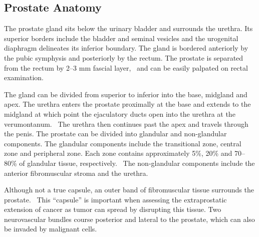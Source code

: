 ﻿\subsection{Prostate Anatomy}

The prostate gland sits below the urinary bladder and surrounds the urethra.
Its superior borders include the bladder and seminal vesicles and the
urogenital diaphragm delineates its inferior boundary. The gland is bordered
anteriorly by the pubic symphysis and posteriorly by the rectum.  The prostate
is separated from the rectum by 2--3 mm fascial layer,~\cite{Jung2012} and can
be easily palpated on rectal examination. 

The gland can be divided from superior to inferior into the base, midgland and
apex. The urethra enters the prostate proximally at the base and extends to the
midgland at which point the ejaculatory ducts open into the urethra at the
verumontanum.~\cite{Jung2012} The urethra then continues past the apex and
travels through the penis. The prostate can be divided into glandular and
non-glandular components.  The glandular components include the transitional
zone, central zone and peripheral zone. Each zone contains approximately 5\%,
20\% and 70--80\% of glandular tissue, respectively.~\cite{Bonekamp2011} The
non-glandular components include the anterior fibromuscular stroma and the
urethra. 

Although not a true capsule, an outer band of fibromuscular tissue surrounds
the prostate.~\cite{Bonekamp2011} This ``capsule'' is important when assessing
the extraprostatic extension of cancer as tumor can spread by disrupting this
tissue. Two neurovascular bundles course posterior and lateral to the prostate,
which can also be invaded by malignant cells.  
